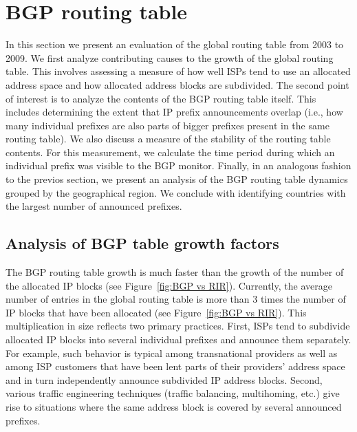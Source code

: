 \section{BGP routing table}
\label{sec:bgp}

In this section we present an evaluation of the global routing table from 2003
to 2009. We first analyze contributing causes to the growth of the global
routing table. This involves assessing a measure of how well ISPs tend to use
an allocated address space and how allocated address blocks are subdivided.
The second point of interest is to analyze the contents of the BGP routing
table itself. This includes determining the extent that IP prefix
announcements overlap (i.e., how many individual prefixes are also parts of
bigger prefixes present in the same routing table). We also discuss a measure
of the stability of the routing table contents. For this measurement, we
calculate the time period during which an individual prefix was visible to the
BGP monitor. Finally, in an analogous fashion to the previos section, we
present an analysis of the BGP routing table dynamics grouped by the
geographical region. We conclude with identifying countries with the largest
number of announced prefixes.

\subsection{Analysis of BGP table growth factors}

The BGP routing table growth is much faster than the growth of the number of
the allocated IP blocks (see Figure~\ref{fig:BGP vs RIR}). Currently, the
average number of entries in the global routing table is more than 3 times the
number of IP blocks that have been allocated (see Figure~\ref{fig:BGP vs
RIR}). This multiplication in size reflects two primary practices. First, ISPs
tend to subdivide allocated IP blocks into several individual prefixes and
announce them separately. For example, such behavior is typical among
transnational providers as well as among ISP customers that have been lent
parts of their providers' address space and in turn independently announce
subdivided IP address blocks. Second, various traffic engineering techniques
(traffic balancing, multihoming, etc.) give rise to situations where the same
address block is covered by several announced prefixes.

